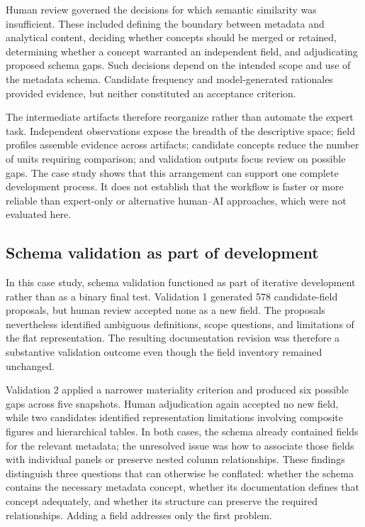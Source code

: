 \documentclass{article}
\begin{document}
Human review governed the decisions for which semantic similarity was insufficient. These included defining the boundary between metadata and analytical content, deciding whether concepts should be merged or retained, determining whether a concept warranted an independent field, and adjudicating proposed schema gaps. Such decisions depend on the intended scope and use of the metadata schema. Candidate frequency and model-generated rationales provided evidence, but neither constituted an acceptance criterion.

The intermediate artifacts therefore reorganize rather than automate the expert task. Independent observations expose the breadth of the descriptive space; field profiles assemble evidence across artifacts; candidate concepts reduce the number of units requiring comparison; and validation outputs focus review on possible gaps. The case study shows that this arrangement can support one complete development process. It does not establish that the workflow is faster or more reliable than expert-only or alternative human--AI approaches, which were not evaluated here.

\subsection{Schema validation as part of development}

In this case study, schema validation functioned as part of iterative development rather than as a binary final test. Validation 1 generated 578 candidate-field proposals, but human review accepted none as a new field. The proposals nevertheless identified ambiguous definitions, scope questions, and limitations of the flat representation. The resulting documentation revision was therefore a substantive validation outcome even though the field inventory remained unchanged.

Validation 2 applied a narrower materiality criterion and produced six possible gaps across five snapshots. Human adjudication again accepted no new field, while two candidates identified representation limitations involving composite figures and hierarchical tables. In both cases, the schema already contained fields for the relevant metadata; the unresolved issue was how to associate those fields with individual panels or preserve nested column relationships. These findings distinguish three questions that can otherwise be conflated: whether the schema contains the necessary metadata concept, whether its documentation defines that concept adequately, and whether its structure can preserve the required relationships. Adding a field addresses only the first problem.
\end{document}

